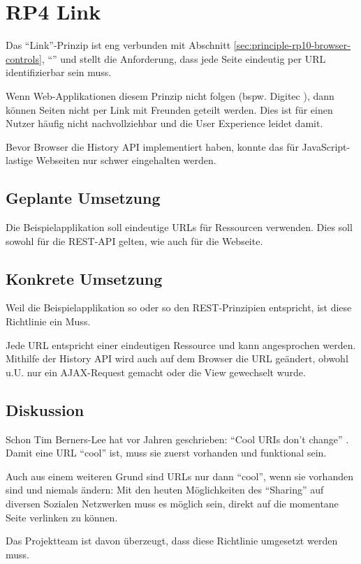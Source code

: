 \section{RP4 Link}
\label{sec:principle-rp4-link}

Das ``Link''-Prinzip ist eng verbunden mit Abschnitt \ref{sec:principle-rp10-browser-controls}, ``'' und stellt die Anforderung, dass jede Seite eindeutig per \gls{URL} identifizierbar sein muss.

Wenn Web-Applikationen diesem Prinzip nicht folgen (bspw. Digitec \cite{Digitec}), dann können Seiten nicht per Link mit Freunden geteilt werden.
Dies ist für einen Nutzer häufig nicht nachvollziehbar und die User Experience leidet damit.

Bevor Browser die History API \cite{HistoryAPI} implementiert haben, konnte das für JavaScript-lastige Webseiten nur schwer eingehalten werden.

\subsection*{Geplante Umsetzung}
Die Beispielapplikation soll eindeutige URLs für Ressourcen verwenden. Dies soll sowohl für die REST-API gelten, wie auch für die Webseite.

\subsection*{Konkrete Umsetzung}
Weil die Beispielapplikation so oder so den \gls{REST}-Prinzipien entspricht, ist diese Richtlinie ein Muss.

Jede URL entspricht einer eindeutigen Ressource und kann angesprochen werden.
Mithilfe der History API \cite{HistoryAPI} wird auch auf dem Browser die URL
geändert, obwohl u.U. nur ein AJAX-Request gemacht oder die View gewechselt wurde.

\subsection*{Diskussion}
Schon Tim Berners-Lee hat vor Jahren geschrieben: ``Cool URIs don't change'' \cite{CoolURIsTBL}.
Damit eine URL ``cool'' ist, muss sie zuerst vorhanden und funktional sein.

Auch aus einem weiteren Grund sind URLs nur dann ``cool'', wenn sie vorhanden sind
und niemals ändern: Mit den heuten Möglichkeiten des ``Sharing'' auf diversen Sozialen
Netzwerken muss es möglich sein, direkt auf die momentane Seite verlinken zu können.

Das Projektteam ist davon überzeugt, dass diese Richtlinie umgesetzt werden muss.